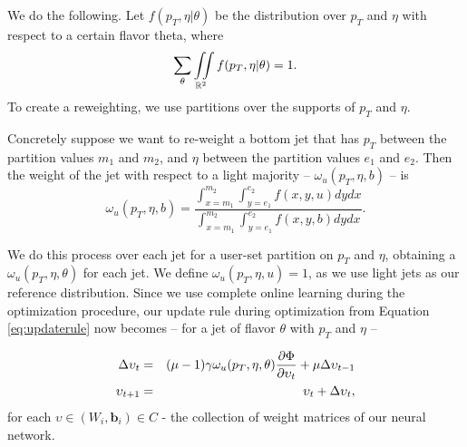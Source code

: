We do the following. Let $f(p_T,\eta \vert \theta)$ be the distribution over $p_T$ and $\eta$ with respect to a certain flavor theta, where $$\sum_\theta \iint\limits_{\mathbb{R}^2}f(p_T,\eta | \theta) = 1.$$ To create a reweighting, we use partitions over the supports of $p_T$ and $\eta$. 

Concretely suppose we want to re-weight a bottom jet that has $p_T$ between the partition values $m_1$ and $m_2$, and $\eta$ between the partition values $e_1$ and $e_2$. Then the weight of the jet with respect to a light majority -- $\omega_u(p_T, \eta, b)$ -- is 
\begin{equation}
\omega_u(p_T, \eta, b) = \frac{\int_{x = m_1}^{m_2}\int_{y = e_1}^{e_2} f(x,y,u)dydx}{\int_{x = m_1}^{m_2}\int_{y = e_1}^{e_2} f(x,y,b)dydx}.
\end{equation}

We do this process over each jet for a user-set partition on $p_T$ and $\eta$, obtaining a $\omega_u(p_T, \eta, \theta)$ for each jet. We define $\omega_u(p_T, \eta, u) = 1$, as we use light jets as our reference distribution. Since we use complete online learning during the optimization procedure, our update rule during optimization from Equation \eqref{eq:updaterule} now becomes -- for a jet of flavor $\theta$ with $p_T$ and $\eta$ -- 

\begin{eqnarray}
\Delta\upsilon_{t} &=& (\mu - 1)\gamma\omega_u(p_T, \eta, \theta)\frac{\partial \Phi}{\partial \upsilon_t}+ \mu\Delta\upsilon_{t - 1}\\
\upsilon_{t+1} &=& \upsilon_t + \Delta\upsilon_{t},
\end{eqnarray}
for each $\upsilon\in(W_i, \mathbf{b}_i)\in C$ - the collection of weight matrices of our neural network. 































